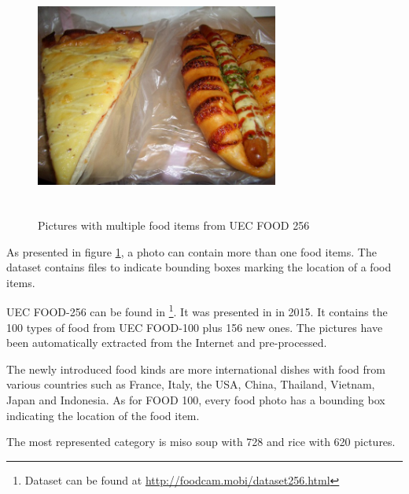 \begin{figure}[h]
    \includegraphics[width=8cm, height=8cm]{img/multiple_food_items_4}
    \caption{Pictures with multiple food items from UEC FOOD 256}
    \label{fig:presentation_multiple_food_items}
\end{figure}

As presented in figure \ref{fig:presentation_multiple_food_items}, a photo can contain more than one food items. The dataset contains files to indicate bounding boxes marking the location of a food items.

UEC FOOD-256 can be found in \footnote{Dataset can be found at \url{http://foodcam.mobi/dataset256.html}}. It was presented in \cite{Kawano2015} in 2015. It contains  the 100 types of food from UEC FOOD-100 plus 156 new ones. The pictures have been automatically  extracted from the Internet and pre-processed. 

The newly introduced food kinds are more international dishes with food from various countries such as France, Italy, the USA, China, Thailand, Vietnam, Japan and Indonesia. As for FOOD 100, every food photo has a bounding box indicating the location of the food item.

The most represented category is miso soup with 728 and rice with 620 pictures.